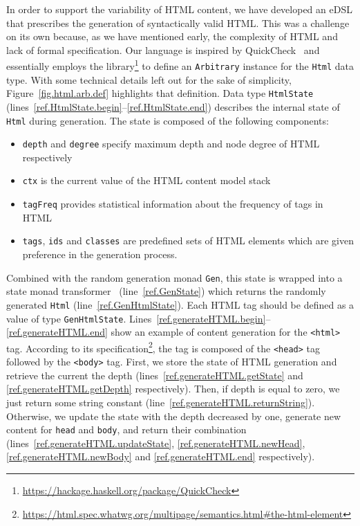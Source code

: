 \documentclass[sigconf]{acmart}
\begin{document}
In order to support the variability of HTML content, we have developed an eDSL that prescribes the generation of syntactically valid HTML. This was a challenge on its own because, as we have mentioned early, the complexity of HTML and lack of formal specification. Our language is inspired by QuickCheck~\cite{claessen2011quickcheck} and essentially employs the library\footnote{\url{https://hackage.haskell.org/package/QuickCheck}} to define an \texttt{Arbitrary} instance for the \texttt{Html} data type. With some technical details left out for the sake of simplicity, Figure~\ref{fig.html.arb.def} highlights that definition. Data type \texttt{HtmlState} (lines~\ref{ref.HtmlState.begin}--\ref{ref.HtmlState.end}) describes the internal state of \texttt{Html} during generation. The state is composed of the following components:
\begin{itemize}
\item \texttt{depth} and \texttt{degree} specify maximum depth and node degree of HTML respectively
\item \texttt{ctx} is the current value of the HTML content model stack 
\item \texttt{tagFreq} provides statistical information about the frequency of tags in HTML
\item \texttt{tags}, \texttt{ids} and \texttt{classes} are predefined sets of HTML elements which are given preference in the generation process.  
\end{itemize}
Combined with the random generation monad \texttt{Gen}, this state is wrapped into a state monad transformer~\cite{jones1995functional} (line~\ref{ref.GenState}) which returns the randomly generated \texttt{Html} (line~\ref{ref.GenHtmlState}). Each HTML tag should be defined as a value of type \texttt{GenHtmlState}. Lines~\ref{ref.generateHTML.begin}--\ref{ref.generateHTML.end} show an example of content generation for the \texttt{<html>} tag. According to its specification\footnote{\url{https://html.spec.whatwg.org/multipage/semantics.html\#the-html-element}}, the tag is composed of the \texttt{<head>} tag followed by the \texttt{<body>} tag. First, we store the state of HTML generation and retrieve the current the depth (lines~\ref{ref.generateHTML.getState} and \ref{ref.generateHTML.getDepth} respectively). Then, if depth is equal to zero, we just return some string constant (line~\ref{ref.generateHTML.returnString}). Otherwise, we update the state with the depth decreased by one, generate new content for \texttt{head} and \texttt{body}, and return their combination (lines~\ref{ref.generateHTML.updateState}, \ref{ref.generateHTML.newHead}, \ref{ref.generateHTML.newBody} and \ref{ref.generateHTML.end} respectively).
\end{document}
